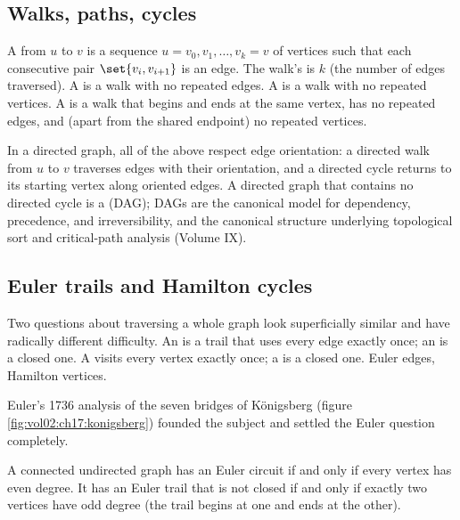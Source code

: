\subsection{Walks, paths, cycles}

A  from $u$ to $v$ is a sequence $u = v_{0}, v_{1},
\ldots, v_{k} = v$ of vertices such that each consecutive pair
$\set{v_{i}, v_{i+1}}$ is an edge. The walk's  is
$k$ (the number of edges traversed). A  is a walk
with no repeated edges. A  is a walk with no repeated
vertices. A  is a walk that begins and ends at the
same vertex, has no repeated edges, and (apart from the shared
endpoint) no repeated vertices.

In a directed graph, all of the above respect edge orientation: a
directed walk from $u$ to $v$ traverses edges with their
orientation, and a directed cycle returns to its starting vertex
along oriented edges. A directed graph that contains no directed
cycle is a  (DAG); DAGs are the
canonical model for dependency, precedence, and irreversibility,
and the canonical structure underlying topological sort and
critical-path analysis (Volume IX).

\subsection{Euler trails and Hamilton cycles}

Two questions about traversing a whole graph look superficially
similar and have radically different difficulty. An  is a trail that uses every edge exactly once; an
 is a closed one. A 
visits every vertex exactly once; a  is a
closed one. Euler edges, Hamilton vertices.

Euler's 1736 analysis of the seven bridges of K\"{o}nigsberg
(figure \ref{fig:vol02:ch17:konigsberg}) founded the subject and
settled the Euler question completely.



\begin{principle}
A connected undirected graph has an Euler circuit if and only if
every vertex has even degree. It has an Euler trail that is not
closed if and only if exactly two vertices have odd degree (the
trail begins at one and ends at the other).
\end{principle}

